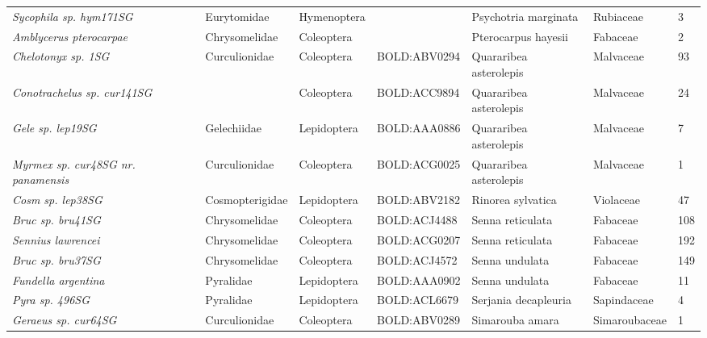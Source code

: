 \documentclass[11pt]{article}
\begin{document}
\begin{landscape}
\begin{longtable}{@{}lllllll@{}}
\textit{Sycophila sp. hym171SG}                       & Eurytomidae     & Hymenoptera  &              & Psychotria marginata               & Rubiaceae        & 3     \\
\textit{Amblycerus pterocarpae}                       & Chrysomelidae   & Coleoptera   &              & Pterocarpus hayesii                & Fabaceae         & 2     \\
\textit{Chelotonyx sp. 1SG}                           & Curculionidae   & Coleoptera   & BOLD:ABV0294 & Quararibea asterolepis             & Malvaceae        & 93    \\
\textit{Conotrachelus sp. cur141SG}                   &                 & Coleoptera   & BOLD:ACC9894 & Quararibea asterolepis             & Malvaceae        & 24    \\
\textit{Gele sp. lep19SG}                             & Gelechiidae     & Lepidoptera  & BOLD:AAA0886 & Quararibea asterolepis             & Malvaceae        & 7     \\
\textit{Myrmex sp. cur48SG nr. panamensis}            & Curculionidae   & Coleoptera   & BOLD:ACG0025 & Quararibea asterolepis             & Malvaceae        & 1     \\
\textit{Cosm sp. lep38SG}                             & Cosmopterigidae & Lepidoptera  & BOLD:ABV2182 & Rinorea sylvatica                  & Violaceae        & 47    \\
\textit{Bruc  sp. bru41SG}                            & Chrysomelidae   & Coleoptera   & BOLD:ACJ4488 & Senna reticulata                   & Fabaceae         & 108   \\
\textit{Sennius lawrencei}                            & Chrysomelidae   & Coleoptera   & BOLD:ACG0207 & Senna reticulata                   & Fabaceae         & 192   \\
\textit{Bruc sp. bru37SG}                             & Chrysomelidae   & Coleoptera   & BOLD:ACJ4572 & Senna undulata                     & Fabaceae         & 149   \\
\textit{Fundella argentina}                           & Pyralidae       & Lepidoptera  & BOLD:AAA0902 & Senna undulata                     & Fabaceae         & 11    \\
\textit{Pyra sp. 496SG}                               & Pyralidae       & Lepidoptera  & BOLD:ACL6679 & Serjania decapleuria               & Sapindaceae      & 4     \\
\textit{Geraeus sp. cur64SG}                          & Curculionidae   & Coleoptera   & BOLD:ABV0289 & Simarouba amara                    & Simaroubaceae    & 1     \\

\end{longtable}
\end{landscape}
\end{document}
